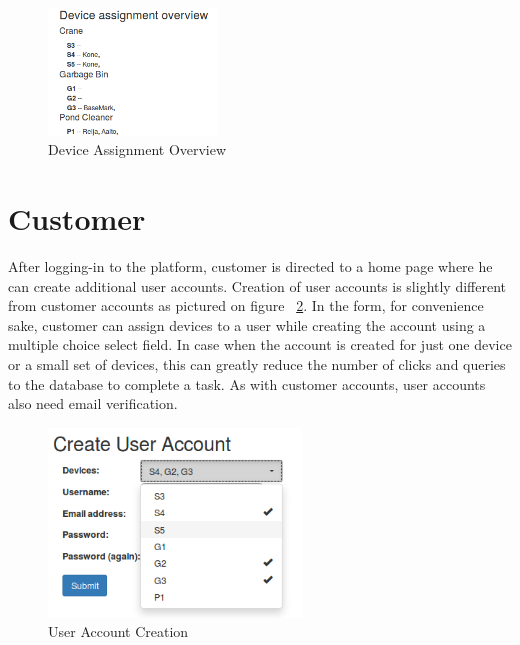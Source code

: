 \begin{figure}[ht]
	\begin{center}
		\includegraphics[width=0.4\textwidth]{images/implementation/DeviceAssignment}
		\caption{Device Assignment Overview}
		\label{fig:DeviceAssignment}
	\end{center}
\end{figure}


\section{Customer}
\label{section:customer}

 After logging-in to the platform, customer is directed to a home page where he can create additional user accounts. Creation of user accounts is slightly different from customer accounts as pictured on figure ~\ref{fig:CreateUser}. In the form, for convenience sake, customer can assign devices to a user while creating the account using a multiple choice select field. In case when the account is created for just one device or a small set of devices, this can greatly reduce the number of clicks and queries to the database to complete a task. As with customer accounts, user accounts also need email verification.

\begin{figure}[ht]
	\begin{center}
		\includegraphics[width=0.6\textwidth]{images/implementation/CreateUser}
		\caption{User Account Creation}
		\label{fig:CreateUser}
	\end{center}
\end{figure}

